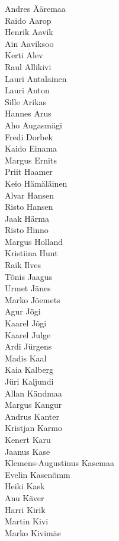 \begin{multicols}{3}
\small
Andres Ääremaa\\
Raido Aarop\\
Henrik Aavik\\
Ain Aaviksoo\\
Kerti Alev\\
Raul Allikivi\\
Lauri Antalainen\\
Lauri Anton\\
Sille Arikas\\
Hannes Arus\\
Aho Augasmägi\\
Fredi Dorbek\\
Kaido Einama\\
Margus Ernits\\
Priit Haamer\\
Keio Hämäläinen\\
Alvar Hansen\\
Risto Hansen\\
Jaak Härma\\
Risto Hinno\\
Margus Holland\\
Kristiina Hunt\\
Raik Ilves\\
Tõnis Jaagus\\
Urmet Jänes\\
Marko Jõemets\\
Agur Jõgi\\
Kaarel Jõgi\\
Kaarel Julge\\
Ardi Jürgens\\
Madis Kaal\\
Kaia Kalberg\\
Jüri Kaljundi\\
Allan Kändmaa\\
Margus Kangur\\
Andrus Kanter\\
Kristjan Karmo\\
Kenert Karu\\
Jaanus Kase\\
Klemens-Augustinus Kasemaa\\
Evelin Kasenõmm\\
Heiki Kask\\
Anu Käver\\
Harri Kirik\\
Martin Kivi\\
Marko Kivimäe\\

\end{multicols}
